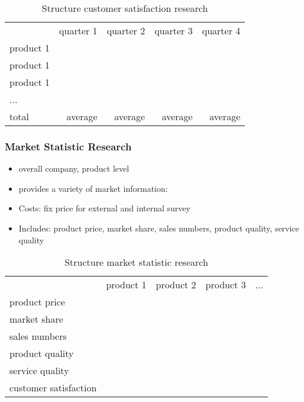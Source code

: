     \begin{table}[ht]
    \centering
    \begin{tabular}{|l|r|r|r|r|}
    \hline
                & quarter 1   & quarter 2  & quarter 3 & quarter 4 \\
    product 1   &             &            &           &           \\
    product 1   &             &            &           &           \\
    product 1   &             &            &           &           \\
    ...         &             &            &           &           \\
    total       & average     & average    & average   & average   \\
    \hline
    \end{tabular}
    \caption{Structure customer satisfaction research}
    \label{MR_customer_satisfaction}
    \end{table}
    
\subsubsection{Market Statistic Research}
    \begin{itemize}
        \item overall company, product level
        \item provides a variety of market information: 
        \item Costs: fix price for external and internal survey
        \item Includes: product price, market share, sales numbers, product quality, service quality 
    \end{itemize}
    
    \begin{table}[ht]
    \centering
    \begin{tabular}{|l|r|r|r|r|}
    \hline
                            & product 1   & product 2  & product 3 & ...       \\
    product price           &             &            &           &           \\
    market share            &             &            &           &           \\
    sales numbers           &             &            &           &           \\
    product quality         &             &            &           &           \\
    service quality         &             &            &           &           \\
    customer satisfaction   &             &            &           &           \\
    \hline
    \end{tabular}
    \caption{Structure market statistic research}
    \label{MR_market_statistic}
    \end{table}